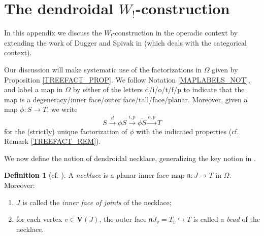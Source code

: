 \documentclass[a4paper,10pt]{article}%
\numberwithin{equation}{section}
\numberwithin{figure}{section}
\theoremstyle{definition} %
\newtheorem{definition}[equation]{Definition}%
\newcommand{\1}{\ensuremath{\mathbbm 1}}%
\begin{document}
\appendix







\section{The dendroidal $W_!$-construction}
\label{WCONS AP}



In this appendix we discuss the 
$W_!$-construction in the operadic context by extending the  
work of Dugger and Spivak in \cite{DS11} 
(which deals with the categorical context).

Our discussion will make systematic
use of the factorizations in $\Omega$ given by 
Proposition \ref{TREEFACT_PROP}.
We follow Notation \ref{MAPLABELS_NOT},
and label 
a map in $\Omega$
by either of the letters d/i/o/t/f/p
to indicate that the map is
a degeneracy/inner face/outer face/tall/face/planar.
Moreover, given a map $\phi\colon S \to T$,
we write
\[
	S \xrightarrow{d}
	\phi S \xrightarrow{i,p}
	\overline{\phi S} \xrightarrow{o,p}
	T
\]
for the (strictly) unique 
factorization of $\phi$ with the indicated properties
(cf. Remark \ref{TREEFACT_REM}).



We now define the notion of dendroidal necklace,
generalizing the key notion in \cite{DS11}.
 

\begin{definition}[{cf. \cite[\S 3]{DS11}}]
	A \emph{necklace} is 
	a planar inner face map
	$\mathfrak{n} \colon J \to T$
	in $\Omega$.
	Moreover:
	\begin{enumerate}[label = (\roman*)]
		\item 
		$J$ is called the \emph{inner face of joints} of the necklace;
		\item for each vertex $v \in \boldsymbol{V}(J)$,
		the outer face
		$\overline{\mathfrak{n} J_v} = T_v \hookrightarrow T$
		is called a \emph{bead} of the necklace.
	\end{enumerate}
\end{definition}
\end{document}
